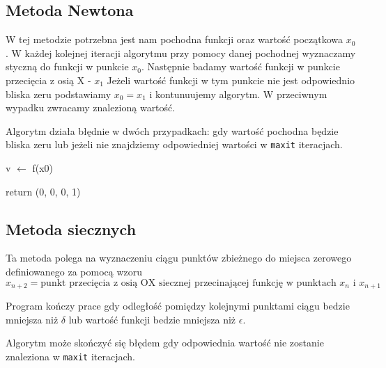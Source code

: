 \documentclass{article}
\begin{document}
\subsection{Metoda Newtona}

W tej metodzie potrzebna jest nam pochodna funkcji oraz wartość początkowa $x_0$.
W każdej kolejnej iteracji algorytmu przy pomocy danej pochodnej wyznaczamy styczną do funkcji w punkcie $x_0$.
Następnie badamy wartość funkcji w punkcie przecięcia z osią X - $x_1$
Jeżeli wartość funkcji w tym punkcie nie jest odpowiednio bliska zeru podstawiamy $x_0 = x_1$ i kontunuujemy algorytm.
W przeciwnym wypadku zwracamy znalezioną wartość.

Algorytm działa błędnie w dwóch przypadkach: gdy wartość pochodna będzie bliska zeru lub jeżeli nie znajdziemy odpowiedniej wartości w \texttt{maxit} iteracjach.

\begin{algorithm}[H]

  v $\leftarrow$ f(x0)



  return (0, 0, 0, 1)

\end{algorithm}

\subsection{Metoda siecznych}

Ta metoda polega na wyznaczeniu ciągu punktów zbieżnego do miejsca zerowego definiowanego za pomocą wzoru
$$
x_{n+2} = \text{punkt przecięcia z osią OX siecznej przecinającej funkcję w punktach } x_n \text{ i } x_{n+1}
$$

Program kończy prace gdy odległość pomiędzy kolejnymi punktami ciągu bedzie mniejsza niż $\delta$ lub wartość funkcji bedzie mniejsza niż $\epsilon$.

Algorytm może skończyć się błędem gdy odpowiednia wartość nie zostanie znaleziona w \texttt{maxit} iteracjach.
\end{document}
